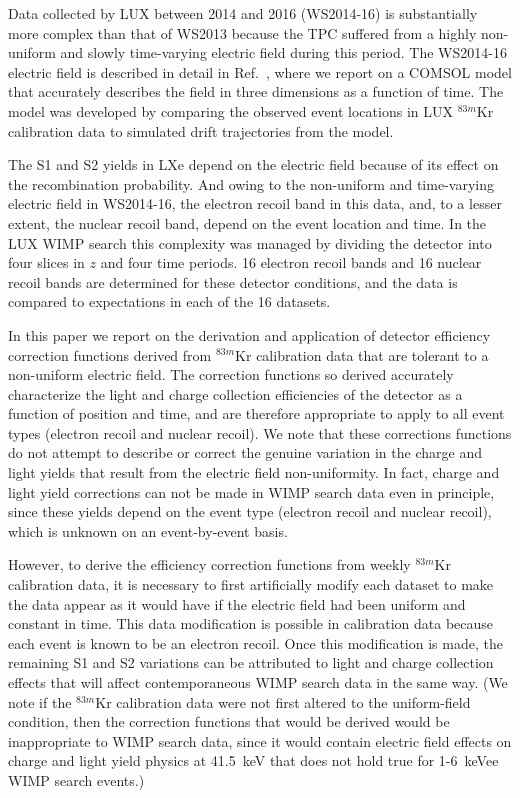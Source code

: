 Data collected by LUX between 2014 and 2016 (WS2014-16) is substantially 
more complex than that of WS2013 because the TPC suffered from a highly non-uniform and slowly time-varying 
electric field during this period. The WS2014-16 electric field is described in detail in Ref.~\cite{luciespaper},
where we report on a COMSOL model that accurately describes the field 
in three dimensions as a function of time. The model was developed by comparing the observed
event locations in LUX $^{83m}$Kr calibration data to simulated drift trajectories from the model.

The S1 and S2 yields in LXe depend on the electric field because of its effect on 
the recombination probability. And owing to the non-uniform and time-varying electric field in WS2014-16, 
the electron recoil band in this data, and, to a lesser extent, the nuclear recoil band, 
depend on the event location and time. In the LUX WIMP search this complexity was managed
by dividing the detector into four slices in $z$ and four time periods. 16 electron recoil bands and 
16 nuclear recoil bands are determined for these detector conditions, and the data is compared
to expectations in each of the 16 datasets. 

In this paper we report on the derivation and application of detector efficiency correction functions
derived from $^{83m}$Kr calibration data that are tolerant to a non-uniform electric field. The 
correction functions so derived accurately characterize the light and charge collection efficiencies 
of the detector as a function of position and time, and are therefore 
appropriate to apply to all event types (electron recoil and nuclear recoil). We note
that these corrections functions do not attempt to describe or correct 
the genuine variation in the charge and light yields
that result from the electric field non-uniformity. In fact, charge and light yield corrections 
can not be made in WIMP search data even in principle, since these yields depend on the event type (electron
recoil and nuclear recoil), which is unknown on an event-by-event basis.

However, to derive the efficiency correction functions from weekly $^{83m}$Kr calibration data, 
it is necessary to first artificially modify each dataset to make the data appear as it would have if
the electric field had been uniform and constant in time. This data modification is possible in calibration data
because each event is known to be an electron recoil. Once this modification is made, the 
remaining S1 and S2 variations can be attributed to light and charge collection effects that will
affect contemporaneous WIMP search data in the same way. (We note if the $^{83m}$Kr calibration data
were not first altered to the uniform-field condition, then the correction functions that would be
derived would be inappropriate to WIMP search data, since it would contain electric field effects on charge and
light yield physics at 41.5~keV that does not hold true for 1-6~keVee WIMP search events.) 

